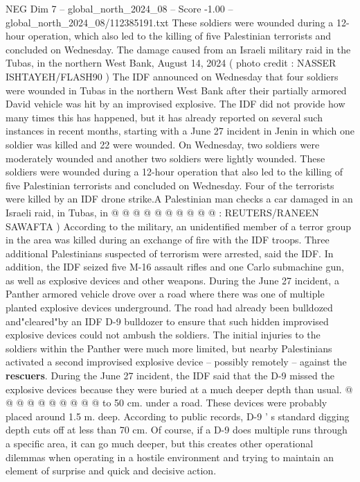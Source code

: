 \begin{textsample}{NEG Dim 7 – global\_north\_2024\_08 – Score -1.00 – global\_north\_2024\_08/112385191.txt}  \label{ex:f7_neg_445}
These soldiers were wounded during a 12-hour operation, which also led to the killing of five Palestinian terrorists and concluded on Wednesday.
The damage caused from an Israeli military raid in the Tubas, in the northern West Bank, August 14, 2024 ( photo credit : NASSER ISHTAYEH/FLASH90 ) The IDF announced on Wednesday that four soldiers were wounded in Tubas in the northern West Bank after their partially armored David vehicle was hit by an improvised explosive.
The IDF did not provide how many times this has happened, but it has already reported on several such instances in recent months, starting with a June 27 incident in Jenin in which one soldier was killed and 22 were wounded.
On Wednesday, two soldiers were moderately wounded and another two soldiers were lightly wounded.
These soldiers were wounded during a 12-hour operation that also led to the killing of five Palestinian terrorists and concluded on Wednesday.
Four of the terrorists were killed by an IDF drone strike.A Palestinian man checks a car damaged in an Israeli raid, in Tubas, in @ @ @ @ @ @ @ @ @ @ : REUTERS/RANEEN SAWAFTA ) According to the military, an unidentified member of a terror group in the area was killed during an exchange of fire with the IDF troops.
Three additional Palestinians suspected of terrorism were arrested, said the IDF.
In addition, the IDF seized five M-16 assault rifles and one Carlo submachine gun, as well as explosive devices and other weapons.
During the June 27 incident, a Panther armored vehicle drove over a road where there was one of multiple planted explosive devices underground.
The road had already been bulldozed and"cleared"by an IDF D-9 bulldozer to ensure that such hidden improvised explosive devices could not ambush the soldiers.
The initial injuries to the soldiers within the Panther were much more limited, but nearby Palestinians activated a second improvised explosive device -- possibly remotely -- against the \textbf{rescuers}.
During the June 27 incident, the IDF said that the D-9 missed the explosive devices because they were buried at a much deeper depth than usual. @ @ @ @ @ @ @ @ @ @ to 50 cm. under a road.
These devices were probably placed around 1.5 m. deep.
According to public records, D-9 ' s standard digging depth cuts off at less than 70 cm.
Of course, if a D-9 does multiple runs through a specific area, it can go much deeper, but this creates other operational dilemmas when operating in a hostile environment and trying to maintain an element of surprise and quick and decisive action.

\end{textsample}

